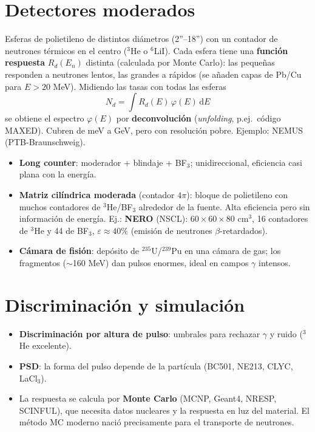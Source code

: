 \section{Detectores moderados}
\begin{clave}
Esferas de polietileno de distintos diámetros (2''--18'') con un contador de neutrones térmicos en el centro ($^3$He o $^6$LiI).
Cada esfera tiene una \textbf{función respuesta} $R_d(E_n)$ distinta (calculada por Monte Carlo): las pequeñas responden a neutrones
lentos, las grandes a rápidos (se añaden capas de Pb/Cu para $E>20$ MeV). Midiendo las tasas con todas las esferas
\[ N_d=\int R_d(E)\,\varphi(E)\,\mathrm{d}E \]
se obtiene el espectro $\varphi(E)$ por \textbf{deconvolución} (\emph{unfolding}, p.ej.\ código MAXED). Cubren de meV a GeV, pero con resolución pobre.
Ejemplo: NEMUS (PTB-Braunschweig).
\end{clave}
\begin{itemize}
\item \textbf{Long counter}: moderador + blindaje + BF$_3$; unidireccional, eficiencia casi plana con la energía.
\item \textbf{Matriz cilíndrica moderada} (contador $4\pi$): bloque de polietileno con muchos contadores de $^3$He/BF$_3$ alrededor de la fuente.
Alta eficiencia pero sin información de energía. Ej.: \textbf{NERO} (NSCL): $60\times60\times80$ cm$^3$, 16 contadores de $^3$He y 44 de BF$_3$,
$\varepsilon\approx40\%$ (emisión de neutrones $\beta$-retardados).
\item \textbf{Cámara de fisión}: depósito de $^{235}$U/$^{239}$Pu en una cámara de gas; los fragmentos ($\sim$160 MeV) dan pulsos enormes, ideal en campos $\gamma$ intensos.
\end{itemize}

\section{Discriminación y simulación}
\begin{itemize}
\item \textbf{Discriminación por altura de pulso}: umbrales para rechazar $\gamma$ y ruido ($^3$He excelente).
\item \textbf{PSD}: la forma del pulso depende de la partícula (BC501, NE213, CLYC, LaCl$_3$).
\item La respuesta se calcula por \textbf{Monte Carlo} (MCNP, Geant4, NRESP, SCINFUL), que necesita datos nucleares y la respuesta en luz del material.
El método MC moderno nació precisamente para el transporte de neutrones.
\end{itemize}
